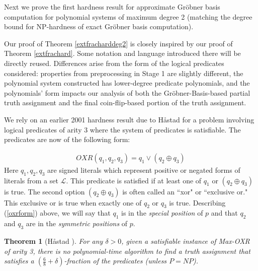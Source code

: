\documentclass{article}
\newtheorem{thm}{Theorem}
\begin{document}
Next we prove the first hardness result for approximate Gr\"{o}bner basis computation for polynomial systems of maximum degree 2 (matching the degree bound for NP-hardness of exact Gr\"{o}bner basis computation).  



Our proof of Theorem \ref{extfracharddeg2} is closely inspired by our proof of Theorem \ref{extfrachard}. Some notation and language introduced there will be directly reused. Differences arise from the form of the logical predicates considered: properties from preprocessing in Stage 1 are slightly different, the polynomial system constructed has lower-degree predicate polynomials, and the polynomials' form impacts our analysis of both the Gr\"{o}bner-Basis-based partial truth assignment and the final coin-flip-based portion of the truth assignment.

We rely on an earlier 2001 hardness result due to H{\aa}stad for a problem involving logical predicates of arity 3 where the system of predicates is satisfiable.  The predicates are now of the following form:

\begin{align}\label{oxrform}
OXR(q_1,q_2,q_3)=q_1 \vee (q_2 \oplus q_3)
\end{align}
Here $q_1,q_2,q_3$ are signed literals which represent positive or negated forms of literals from a set $\mathcal{L}$. This predicate is satisfied if at least one of $q_1$ or $(q_2 \oplus q_3)$ is true.  The second option $(q_2 \oplus q_3)$ is often called an ``xor" or ``exclusive or." This exclusive or is true when exactly one of $q_2$ or $q_3$ is true. Describing (\ref{oxrform}) above, we will say that $q_1$ is in the \textit{special position} of $p$ and that $q_2$ and $q_3$ are in the \textit{symmetric positions} of $p$. 

\begin{thm} [H{\aa}stad \cite{hast01}] \label{hastad2}
For any $\delta>0$, given a satisfiable instance of Max-OXR of arity 3, there is no polynomial-time algorithm to find a truth assignment that satisfies a $(\frac{6}{8}+\delta)$-fraction of the predicates (unless $P=NP$). 
\end{thm}
\end{document}
